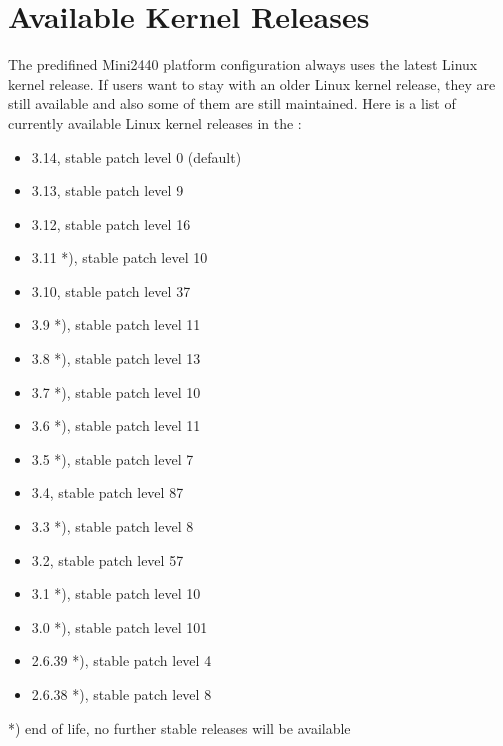 %
%
%
%
%
%

\newcommand{\perCpuName}{S3C2440}
\newcommand{\curKernelRev}{3.14}

\section{Available Kernel Releases}	\label{sec:kernelreleases}

The predifined Mini2440 platform configuration always uses the latest Linux
kernel release. If users want to stay with an older Linux kernel release,
they are still available and also some of them are still maintained. Here is a
list of currently available Linux kernel releases in the \ptxdistBSPName{}:

\begin{itemize}
	\item \curKernelRev{}, stable patch level 0 (default)
	\item 3.13, stable patch level 9
	\item 3.12, stable patch level 16
	\item 3.11 *), stable patch level 10
	\item 3.10, stable patch level 37
	\item 3.9 *), stable patch level 11
	\item 3.8 *), stable patch level 13
	\item 3.7 *), stable patch level 10
	\item 3.6 *), stable patch level 11
	\item 3.5 *), stable patch level 7
	\item 3.4, stable patch level 87
	\item 3.3 *), stable patch level 8
	\item 3.2, stable patch level 57
	\item 3.1 *), stable patch level 10
	\item 3.0 *), stable patch level 101
	\item 2.6.39 *), stable patch level 4
	\item 2.6.38 *), stable patch level 8
\end{itemize}
*) end of life, no further stable releases will be available

